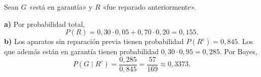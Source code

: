 Sean $G$ «está en garantía» y $R$ «fue reparado anteriormente».

\textbf{a)} Por probabilidad total,
\[
P(R)=0{,}30\cdot0{,}05+0{,}70\cdot0{,}20=\boxed{0{,}155}.
\]
\textbf{b)} Los aparatos sin reparación previa tienen probabilidad $P(R^c)=0{,}845$. Los que además están en garantía tienen probabilidad $0{,}30\cdot0{,}95=0{,}285$. Por Bayes,
\[
P(G\mid R^c)=\frac{0{,}285}{0{,}845}=\frac{57}{169}\approx\boxed{0{,}3373}.
\]
